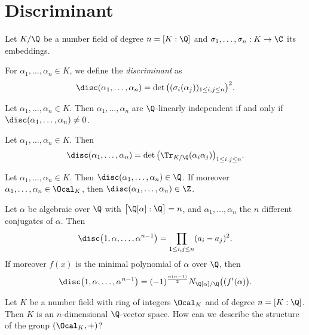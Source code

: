 \section{Discriminant}

Let \( K/\Q \) be a number field of degree \( n = [K:\Q] \) and \( \sigma_1, \dotsc, \sigma_n: K \to \C \) its embeddings.

\begin{defn*}[Discriminant]
	For \( \alpha_1, \dotsc, \alpha_n \in K \), we define the \emph{discriminant} as
	\[ \disc(\alpha_1, \dotsc, \alpha_n) = \det\big( (\sigma_i(\alpha_j))_{1 \leq i,j \leq n} \big)^2. \]
\end{defn*}

\begin{thmn}
	Let \( \alpha_1, \dotsc, \alpha_n \in K \).
	Then \( \alpha_1, \dotsc, \alpha_n \) are \( \Q \)-linearly independent if and only if \( \disc(\alpha_1, \dotsc, \alpha_n) \neq 0 \).
\end{thmn}

\begin{lem}
	Let \( \alpha_1, \dotsc, \alpha_n \in K \). Then
	\[ \disc(\alpha_1, \dotsc, \alpha_n) = \det \big( \Tr_{K/\Q} (\alpha_i \alpha_j) \big)_{1 \leq i,j \leq n}. \]
\end{lem}

\begin{cor}
	Let \( \alpha_1, \dotsc, \alpha_n \in K \).
	Then \( \disc(\alpha_1, \dotsc, \alpha_n) \in \Q \).
	If moreover \( \alpha_1, \dotsc, \alpha_n \in \Ocal_K \), then \( \disc(\alpha_1, \dotsc, \alpha_n) \in \Z \).
\end{cor}

\begin{thmn}
	Let \( \alpha \) be algebraic over \( \Q \) with \( \big[ \Q[\alpha] : \Q \big] = n \), and \( \alpha_1, \dotsc, \alpha_n \) the \( n \) different conjugates of \( \alpha \).
	Then
	\[ \disc \big( 1, \alpha, \dotsc, \alpha^{n-1} \big) = \prod_{1 \leq i,j \leq n} (a_i - a_j)^2. \]
	If moreover \( f(x) \) is the minimal polynomial of \( \alpha \) over \( \Q \), then
	\[ \disc \big(1, \alpha, \dotsc, \alpha^{n-1} \big) = (-1)^\frac{n(n-1)}{2} N_{\Q[\alpha]/\Q} \big( (f'(\alpha) \big). \]
\end{thmn}

\begin{frage*}
	Let \( K \) be a number field with ring of integers \( \Ocal_K \) and of degree \( n = [K:\Q] \).
	Then \( K \) is an \( n \)-dimensional \( \Q \)-vector space.
	How can we describe the structure of the group \( (\Ocal_K, +) \)?
\end{frage*}

